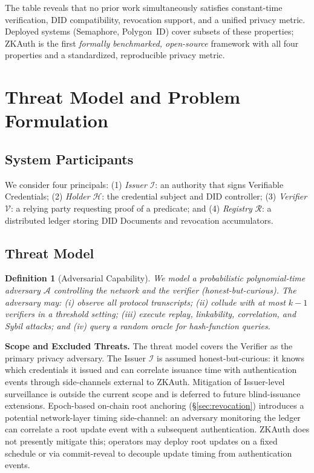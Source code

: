\documentclass[journal,12pt,onecolumn]{IEEEtran}
\newtheorem{definition}{Definition}
\begin{document}
The table reveals that no prior work simultaneously satisfies
constant-time verification, DID compatibility, revocation support, and
a unified privacy metric. Deployed systems (Semaphore, Polygon~ID)
cover subsets of these properties; ZKAuth is the first
\emph{formally benchmarked, open-source} framework with all four
properties and a standardized, reproducible privacy metric.

\section{Threat Model and Problem Formulation}
\label{sec:threatmodel}

\subsection{System Participants}

We consider four principals: (1) \emph{Issuer} $\mathcal{I}$: an
authority that signs Verifiable Credentials; (2) \emph{Holder}
$\mathcal{H}$: the credential subject and DID controller; (3)
\emph{Verifier} $\mathcal{V}$: a relying party requesting proof of a
predicate; and (4) \emph{Registry} $\mathcal{R}$: a distributed ledger
storing DID Documents and revocation accumulators.

\subsection{Threat Model}

\begin{definition}[Adversarial Capability]
We model a probabilistic polynomial-time adversary $\mathcal{A}$
controlling the network and the verifier (honest-but-curious). The
adversary may: (i) observe all protocol transcripts; (ii) collude with
at most $k-1$ verifiers in a threshold setting; (iii) execute replay,
linkability, correlation, and Sybil attacks; and (iv) query a random
oracle for hash-function queries.
\end{definition}

\noindent\textbf{Scope and Excluded Threats.} The threat model covers
the Verifier as the primary privacy adversary. The Issuer
$\mathcal{I}$ is assumed honest-but-curious: it knows which
credentials it issued and can correlate issuance time with
authentication events through side-channels external to ZKAuth.
Mitigation of Issuer-level surveillance is outside the current scope
and is deferred to future blind-issuance extensions.
Epoch-based on-chain root anchoring (§\ref{sec:revocation})
introduces a potential network-layer timing side-channel: an adversary
monitoring the ledger can correlate a root update event with a
subsequent authentication. ZKAuth does not presently mitigate this;
operators may deploy root updates on a fixed schedule or via
commit-reveal to decouple update timing from authentication events.
\end{document}
